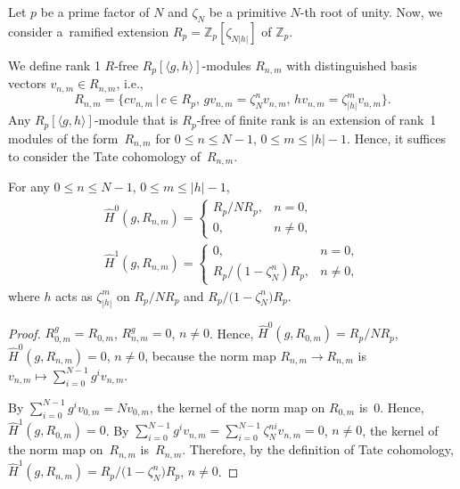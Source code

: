 Let $p$ be a prime factor of $N$ and $\zeta_N$ be a primitive $N$-th root of unity. Now, we consider a~ramified extension $R_p=\mathbb{Z}_p[\zeta_{N|h|}]$ of $\mathbb{Z}_p$.

We define rank 1 $R$-free $R_p[\langle g,h \rangle]$-modules $R_{n,m}$ with distinguished basis vectors $v_{n,m}\in R_{n,m}$, i.e.,
\[
R_{n,m}=\big\{cv_{n,m}\,|\,c\in R_p,\, gv_{n,m}=\zeta_N^nv_{n,m},\, hv_{n,m}=\zeta_{|h|}^mv_{n,m}\big\}.
\]
 Any $R_p[\langle g,h \rangle]$-module that is $R_p$-free of finite rank is an extension of rank~1 modules of the form~$R_{n,m}$ for $0\leq n\leq N-1$, $0\leq m\leq |h|-1$.
Hence, it suffices to consider the Tate cohomology of~$R_{n,m}$.

\begin{Lemma}\label{Tcoho}
For any $0\leq n \leq N-1$, $0\leq m \leq |h|-1$,
\begin{gather*}
\hat{H}^0(g,R_{n,m})= \begin{cases}
R_p/NR_p, & n=0, \\
0, & n\neq 0,
\end{cases}\\
\hat{H}^1(g,R_{n,m})= \begin{cases}
0, & n=0, \\
R_p/(1-\zeta_N^n)R_p, & n\neq 0,
\end{cases}
\end{gather*}
where $h$ acts as $\zeta_{|h|}^m$ on $R_p/NR_p$ and $R_p/\big(1-\zeta_N^n\big)R_p$.
\end{Lemma}

\begin{proof}
$R_{0,m}^g=R_{0,m}$, $R_{n,m}^g=0$, $n\neq 0$. Hence, $\hat{H}^0(g,R_{0,m})=R_p/NR_p$,
 $\hat{H}^0(g,R_{n,m})=0$, $n\neq 0$, because the norm map $R_{n,m} \rightarrow R_{n,m}$ is $v_{n,m} \mapsto \sum_{i=0}^{N-1}g^iv_{n,m}$.

By $\sum_{i=0}^{N-1}g^iv_{0,m}=Nv_{0,m}$, the kernel of the norm map on $R_{0,m}$ is~0. Hence, $\hat{H}^1(g,R_{0,m})=0$. By $\sum_{i=0}^{N-1}g^iv_{n,m}=\sum_{i=0}^{N-1}\zeta_N^{ni}v_{n,m}=0$, $n \neq 0$, the kernel of the norm map on~$R_{n,m}$ is~$R_{n,m}$. Therefore, by the definition of Tate cohomology, $\hat{H}^1(g,R_{n,m})=R_p/\big(1-\zeta_N^n\big)R_p$, $n\neq 0$.
\end{proof}
